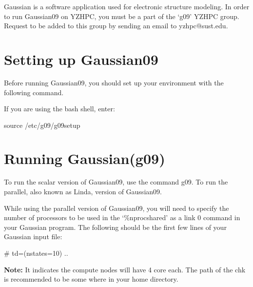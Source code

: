 \documentclass{book}
\begin{document}
Gaussian is a software application used for electronic structure modeling. In order to run Gaussian09 on YZHPC, you must be a part of the ‘g09’ YZHPC group.  Request to be added to this group by sending an email to yzhpc@sust.edu.  

\section{Setting up Gaussian09}%
\label{sec:setting_up_gaussian09}

Before running Gaussian09, you should set up your environment with the following command.

If you are using the bash shell, enter:

\begin{myverbatim}
	source /etc/g09/g09setup
\end{myverbatim}

\section{Running Gaussian(g09)}%
\label{sec:running_gaussian_g09_}

To run the scalar version of Gaussian09, use the command g09. To run the parallel, also known as Linda, version of Gaussian09.

While using the parallel version of Gaussian09, you will need to specify the number of processors to be used in the ‘\%nprocshared’ as a link 0 command in your Gaussian program. The following should be the first few lines of your Gaussian input file:

\begin{myverbatim}
	# td=(nstates=10) ..
\end{myverbatim}

\textbf{Note:} It indicates the compute nodes will have 4 core each. The path of the chk is recommended to be some where in your home directory.
\end{document}
